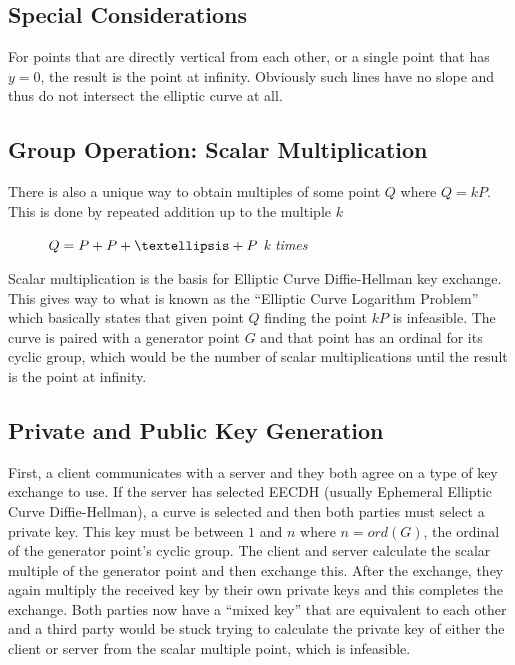 \documentclass[conference]{IEEEtran}
\begin{document}
\subsection{Special Considerations}
For points that are directly vertical from each other, or a single point that has $y = 0$, the result is the point at infinity. Obviously such lines have no slope and thus do not intersect the elliptic curve at all.

\subsection{Group Operation: Scalar Multiplication}
There is also a unique way to obtain multiples of some point $Q$ where $Q = kP$. This is done by repeated addition up to the multiple $k$

\begin{figure}[h]
	\begin{center}
		$Q = P + P + \textellipsis + P$ \textit{k times}
	\end{center}
\end{figure}

Scalar multiplication is the basis for Elliptic Curve Diffie-Hellman key exchange. This gives way to what is known as the ``Elliptic Curve Logarithm Problem'' which basically states that given point $Q$ finding the point $kP$ is infeasible. The curve is paired with a generator point $G$ and that point has an ordinal for its cyclic group, which would be the number of scalar multiplications until the result is the point at infinity.

\subsection{Private and Public Key Generation}
First, a client communicates with a server and they both agree on a type of key exchange to use. If the server has selected EECDH (usually Ephemeral Elliptic Curve Diffie-Hellman), a curve is selected and then both parties must select a private key. This key must be between $1$ and $n$ where $n = ord(G)$, the ordinal of the generator point's cyclic group. The client and server calculate the scalar multiple of the generator point and then exchange this. After the exchange, they again multiply the received key by their own private keys and this completes the exchange. Both parties now have a ``mixed key'' that are equivalent to each other and a third party would be stuck trying to calculate the private key of either the client or server from the scalar multiple point, which is infeasible.
\end{document}
